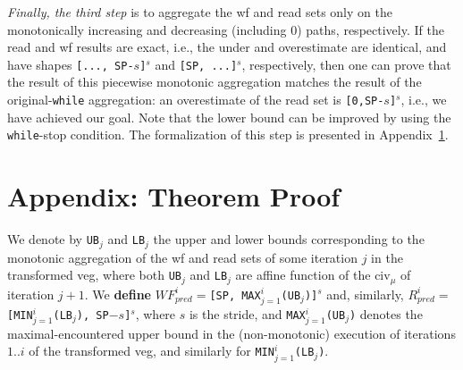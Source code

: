 \documentclass{sig-alternate}
\begin{document}
{\em Finally, the third step} is to aggregate the {\sc wf} and read sets 
only on the monotonically increasing and decreasing (including $0$) paths,
respectively. 
If the read and {\sc wf} results are exact, i.e., the under 
and overestimate are identical, and have shapes {\tt [..., SP-$s$]$^s$}  
and {\tt[SP, ...]$^s$}, respectively, then 
one can prove that the result of this piecewise monotonic
aggregation matches the result of the original-{\tt while} aggregation:
an overestimate of the 
read set is {\tt [0,SP-$s$]$^s$}, i.e., 
we have achieved our goal. 
Note that the lower bound can be improved by using the {\tt while}-stop condition. 
The formalization of this step is presented in Appendix~\ref{app:TheoremProof}. 

\section{Appendix: Theorem Proof} %
\label{app:TheoremProof}

\begin{definition}
We denote by {\tt UB$_j$} and {\tt LB$_j$} the upper and lower bounds corresponding
to the monotonic aggregation of the {\sc wf} and {\sc read} sets of some iteration
$j$ in the transformed {\sc veg}, where both {\tt UB$_j$} and {\tt LB$_j$} are
affine function of the {\sc civ}$_\mu$ of iteration $j+1$.
We {\bf define} $WF_{pred}^{i} = ${\tt[SP, MAX$_{j=1}^{i}$(UB$_j$)]$^s$} and, similarly, 
$R_{pred}^{i} = ${\tt[MIN$_{j=1}^{i}$(LB$_j$), SP$-s$]$^s$}, where $s$ is the stride,
and {\tt MAX$_{j=1}^{i}$(UB$_j$)} denotes the maximal-encountered upper bound in the
(non-monotonic) execution of iterations $1 .. i$ of the transformed {\sc veg},
and similarly for {\tt MIN$_{j=1}^{i}$(LB$_j$)}.
\end{definition}
\end{document}
